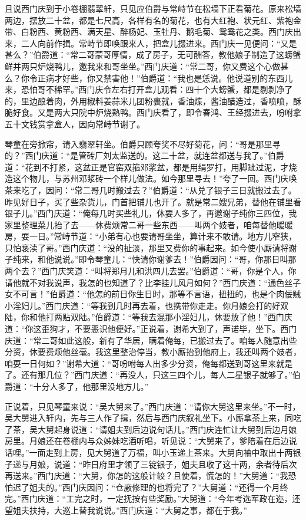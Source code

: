 且说西门庆到于小卷棚翡翠轩，只见应伯爵与常峙节在松墙下正看菊花。原来松墙两边，摆放二十盆，都是七尺高，各样有名的菊花，也有大红袍、状元红、紫袍金带、白粉西、黄粉西、满天星、醉杨妃、玉牡丹、鹅毛菊、鸳鸯花之类。西门庆出来，二人向前作揖。常峙节即唤跟来人，把盒儿掇进来。西门庆一见便问：“又是甚么？”伯爵道：“常二哥蒙哥厚情，成了房子，无可酬答，教他娘子制造了这螃蟹鲜并两只炉烧鸭儿，邀我来和哥坐坐。”西门庆道：“常二哥，你又费这个心做甚么？你令正病才好些，你又禁害他！”伯爵道：“我也是恁说。他说道别的东西儿来，恐怕哥不稀罕。”西门庆令左右打开盒儿观看：四十个大螃蟹，都是剔剥净了的，里边酿着肉，外用椒料姜蒜米儿团粉裹就，香油煠，酱油醋造过，香喷喷，酥脆好食。又是两大只院中炉烧熟鸭。西门庆看了，即令春鸿、王经掇进去，吩咐拿五十文钱赏拿盒人，因向常峙节谢了。

琴童在旁掀帘，请入翡翠轩坐。伯爵只顾夸奖不尽好菊花，问：“哥是那里寻的？”西门庆道：“是管砖厂刘太监送的。这二十盆，就连盆都送与我了。”伯爵道：“花到不打紧，这盆正是官窑双箍邓浆盆，都是用绢罗打，用脚跐过泥，才烧造这个物儿，与苏州邓浆砖一个样儿做法。如今那里寻去！”夸了一回。西门庆唤茶来吃了，因问：“常二哥几时搬过去？”伯爵道：“从兑了银子三日就搬过去了。昨见好日子，买了些杂货儿，门首把铺儿也开了。就是常二嫂兄弟，替他在铺里看银子儿。”西门庆道：“俺每几时买些礼儿，休要人多了，再邀谢子纯你三四位，我家里整理菜儿抬了去——休费烦常二哥一些东西——叫两个妓者，咱每替他暖暖房，耍一日。”常峙节道：“小弟有心也要请哥坐坐，算计来不敢请。地方儿窄狭，只怕亵渎了哥。”西门庆道：“没的扯淡，那里又费你的事起来。如今使小厮请将谢子纯来，和他说说。”即令琴童儿：“快请你谢爹去！”伯爵因问：“哥，你那日叫那两个去？”西门庆笑道：“叫将郑月儿和洪四儿去罢。”伯爵道：“哥，你是个人，你请他就不对我说声，我怎的也知道了？比李挂儿风月如何？”西门庆道：“通色丝子女不可言！”伯爵道：“他怎的前日你生日时，那等不言语，扭扭的，也是个肉佞贼小淫妇儿。”西门庆道：“等我到几时再去着，也携带你走走。你月娘会打的好双陆，你和他打两贴双陆。”伯爵道：“等我去混那小淫妇儿，休要放了他！”西门庆道：“你这歪狗才，不要恶识他便好。”正说着，谢希大到了，声诺毕，坐下。西门庆道：“常二哥如此这般，新有了华居，瞒着俺每，已搬过去了。咱每人随意出些分资，休要费烦他丝毫。我这里整治停当，教小厮抬到他府上，我还叫两个妓者，咱耍一日何如？”谢希大道：“哥吩咐每人出多少分资，俺每都送到哥这里来就是了。还有那几位？”西门庆道：“再没人，只这三四个儿，每人二星银子就够了。”伯爵道：“十分人多了，他那里没地方儿。”

正说着，只见琴童来说：“吴大舅来了。”西门庆道：“请你大舅这里来坐。”不一时，吴大舅进入轩内，先与三人作了揖，然后与西门庆叙礼坐下。小厮拿茶上来，同吃了茶，吴大舅起身说道：“请姐夫到后边说句话儿。”西门庆连忙让大舅到后边月娘房里。月娘还在卷棚内与众姊妹吃酒听唱，听见说：“大舅来了，爹陪着在后边说话哩。”一面走到上房，见大舅道了万福，叫小玉递上茶来。大舅向袖中取出十两银子递与月娘，说道：“昨日府里才领了三锭银子，姐夫且收了这十两，余者待后次再送来。”西门庆道：“大舅，你怎的这般计较？且使着，慌怎的！”大舅道：“我恐怕迟了姐夫的。”西门庆因问：“仓廒修理的也将完了？”大舅道：“还得一个月终完。”西门庆道：“工完之时，一定抚按有些奖励。”大舅道：“今年考选军政在迩，还望姐夫扶持，大巡上替我说说。”西门庆道：“大舅之事，都在于我。”

